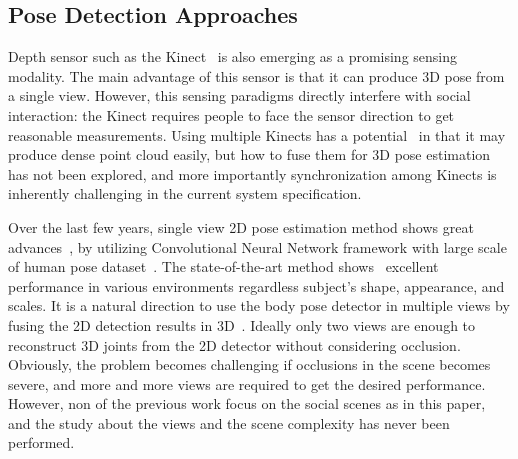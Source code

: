 \subsection{Pose Detection Approaches}

Depth sensor such as the Kinect~\cite{Shotton2011,Baak2011} is also emerging as a promising sensing modality. The main advantage of this sensor is that it can produce 3D pose from a single view. However, this sensing paradigms directly interfere with social interaction: the Kinect requires people to face the sensor direction to get reasonable measurements. Using multiple Kinects has a potential~\cite{Ye-2012} in that it may produce dense point cloud easily, but how to fuse them for 3D pose estimation has not been explored, and more importantly synchronization among Kinects is inherently challenging in the current system specification. 

Over the last few years, single view 2D pose estimation method shows great advances~\cite{Wei-2016}, by utilizing Convolutional Neural Network framework with large scale of human pose dataset~\cite{Andriluka-14}. The state-of-the-art method shows~\cite{Wei-2016} excellent performance in various environments regardless subject's shape, appearance, and scales. It is a natural direction to use the body pose detector in multiple views by fusing the 2D detection results in 3D~\cite{Burenius2013, Amin-13, Belagiannis2014, Elhayek-15, Elhayek-16}. Ideally only two views are enough to reconstruct 3D joints from the 2D detector without considering occlusion. Obviously, the problem becomes challenging if occlusions in the scene becomes severe, and more and more views are required to get the desired performance. However, non of the previous work focus on the social scenes as in this paper, and the study about the views and the scene complexity has never been performed. 








